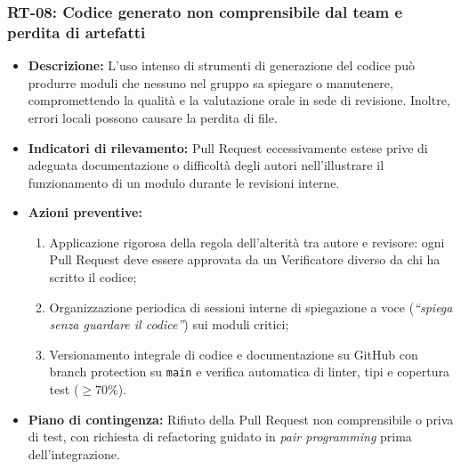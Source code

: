 \subsubsection{RT-08: Codice generato non comprensibile dal team e perdita di artefatti}
\begin{itemize}
    \item \textbf{Descrizione:} L'uso intenso di strumenti di generazione del codice può produrre moduli che nessuno nel gruppo sa spiegare o manutenere, compromettendo la qualità e la valutazione orale in sede di revisione. Inoltre, errori locali possono causare la perdita di file.
    \item \textbf{Indicatori di rilevamento:} Pull Request eccessivamente estese prive di adeguata documentazione o difficoltà degli autori nell'illustrare il funzionamento di un modulo durante le revisioni interne.
    \item \textbf{Azioni preventive:}
    \begin{enumerate}
        \item Applicazione rigorosa della regola dell'alterità tra autore e revisore: ogni Pull Request deve essere approvata da un Verificatore diverso da chi ha scritto il codice;
        \item Organizzazione periodica di sessioni interne di spiegazione a voce (\textit{``spiega senza guardare il codice''}) sui moduli critici;
        \item Versionamento integrale di codice e documentazione su GitHub con branch protection su \texttt{main} e verifica automatica di linter, tipi e copertura test ($\ge 70\%$).
    \end{enumerate}
    \item \textbf{Piano di contingenza:} Rifiuto della Pull Request non comprensibile o priva di test, con richiesta di refactoring guidato in \textit{pair programming} prima dell'integrazione.
\end{itemize}

